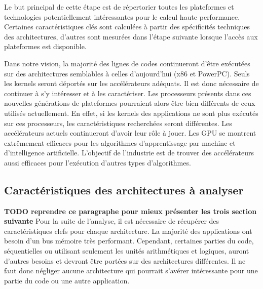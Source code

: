         Le but principal de cette étape est de répertorier toutes les plateformes et technologies potentiellement intéressantes pour le calcul haute performance. Certaines caractéristiques clés sont calculées à partir des spécificités techniques des architectures, d'autres sont mesurées dans l'étape suivante lorsque l'accès aux plateformes est disponible.
    

        Dans notre vision, la majorité des lignes de codes continueront d'être exécutées sur des architectures semblables à celles d'aujourd'hui (x86 et PowerPC). Seuls les \glspl{kernel} seront déportés sur les accélérateurs adéquats. Il est donc nécessaire de continuer à s'y intéresser et à les caractériser. Les processeurs présents dans ces nouvelles générations de plateformes pourraient alors être bien différents de ceux utilisés actuellement. En effet, si les kernels des applications ne sont plus exécutés sur ces processeurs, les caractéristiques recherchées seront différentes. Les accélérateurs actuels continueront d'avoir leur rôle à jouer. Les GPU se montrent extrêmement efficaces pour les algorithmes d'apprentissage par machine et d'intelligence artificielle. L'objectif de l'industrie est de trouver des accélérateurs aussi efficaces pour l'exécution d'autres types d'algorithmes.



\subsection{Caractéristiques des architectures à analyser}
    \textbf{TODO reprendre ce paragraphe pour mieux présenter les trois section suivante}
    Pour la suite de l'analyse, il est nécessaire de récupérer des caractéristiques clefs pour chaque architecture. La majorité des applications ont besoin d'un bus mémoire très performant. Cependant, certaines parties du code, séquentielles ou utilisant seulement les unités arithmétiques et logiques, auront d'autres besoins et devront être portées sur des architectures différentes. Il ne faut donc négliger aucune architecture qui pourrait s'avérer intéressante pour une partie du code ou une autre application. 
    
